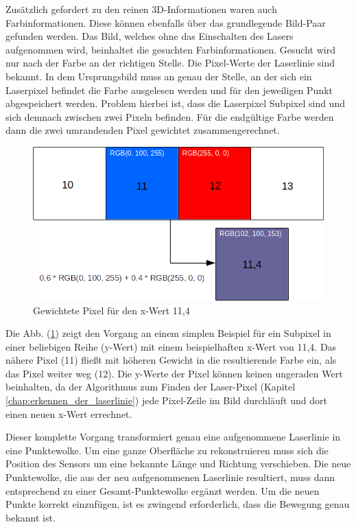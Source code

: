 	Zusätzlich gefordert zu den reinen 3D-Informationen waren auch Farbinformationen. Diese können ebenfalls über das grundlegende Bild-Paar gefunden werden. Das Bild, welches ohne das Einschalten des Lasers aufgenommen wird, beinhaltet die gesuchten Farbinformationen. Gesucht wird nur nach der Farbe an der richtigen Stelle. Die Pixel-Werte der Laserlinie sind bekannt. In dem Ursprungsbild muss an genau der Stelle, an der sich ein Laserpixel befindet die Farbe ausgelesen werden und für den jeweiligen Punkt abgespeichert werden. Problem hierbei ist, dass die Laserpixel Subpixel sind und sich demnach zwischen zwei Pixeln befinden. Für die endgültige Farbe werden dann die zwei umrandenden Pixel gewichtet zusammengerechnet.
	\begin{figure}[h]
		\centering
		\includegraphics[width=0.85\linewidth]{img/hauptteil/bildverarbeitung/weighted_pixel.png}
		\caption{Gewichtete Pixel für den x-Wert 11,4}
		\label{fig:weighted_pixel}
	\end{figure}

	Die Abb. (\ref{fig:weighted_pixel}) zeigt den Vorgang an einem simplen Beispiel für ein Subpixel in einer beliebigen Reihe (y-Wert) mit einem beispielhaften x-Wert von 11,4. Das nähere Pixel (11) fließt mit höheren Gewicht in die resultierende Farbe ein, als das Pixel weiter weg (12). Die y-Werte der Pixel können keinen ungeraden Wert beinhalten, da der Algorithmus zum Finden der Laser-Pixel (Kapitel \ref{chap:erkennen_der_laserlinie}) jede Pixel-Zeile im Bild durchläuft und dort einen neuen x-Wert errechnet.
	
	Dieser komplette Vorgang transformiert genau eine aufgenommene Laserlinie in eine Punktewolke. Um eine ganze Oberfläche zu rekonstruieren muss sich die Position des Sensors um eine bekannte Länge und Richtung verschieben. Die neue Punktewolke, die aus der neu aufgenommenen Laserlinie resultiert, muss dann entsprechend zu einer Gesamt-Punktewolke ergänzt werden. Um die neuen Punkte korrekt einzufügen, ist es zwingend erforderlich, dass die Bewegung genau bekannt ist. 
	
